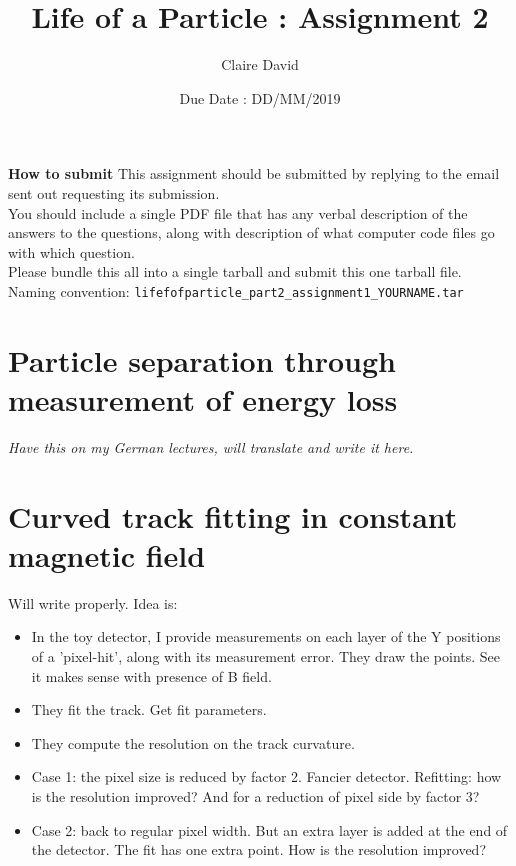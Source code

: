 \documentclass[12pt]{article}
\title{Life of a Particle : Assignment 2}
\author{Claire David}
\date{Due Date : DD/MM/2019}
\begin{document}
\vspace{-2ex}
\maketitle

\textbf{How to submit}
\newline
This assignment should be submitted by replying to the email sent out requesting its submission.\\
You should include a single PDF file that has any verbal description of the answers to the questions, along with description of what computer code files go with which question.\\
Please bundle this all into a single tarball and submit this one tarball file.\\
Naming convention: {\tt{lifefofparticle\_part2\_assignment1\_YOURNAME.tar}}

\section*{Particle separation through measurement of energy loss}

\textit{Have this on my German lectures, will translate and write it here.}

\section*{Curved track fitting in constant magnetic field}

Will write properly. Idea is:

\begin{itemize}
 \item In the toy detector, I provide measurements on each layer of the Y positions of a 'pixel-hit', along with its measurement error. They draw the points. See it makes sense with presence of B field.

 \item They fit the track. Get fit parameters.

 \item They compute the resolution on the track curvature.

 \item Case 1: the pixel size is reduced by factor 2. Fancier detector. Refitting: how is the resolution improved? And for a reduction of pixel side by factor 3?

 \item Case 2: back to regular pixel width. But an extra layer is added at the end of the detector. The fit has one extra point. How is the resolution improved?

\end{itemize}
\end{document}
